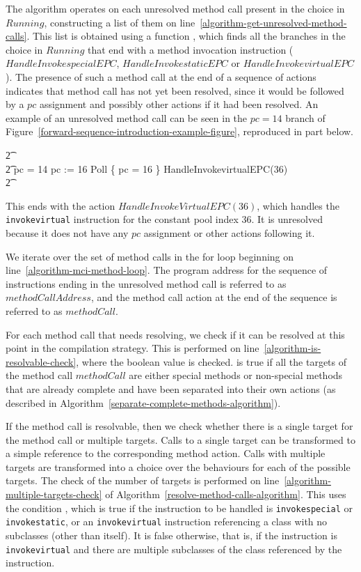 The algorithm operates on each unresolved method call present in the
choice in $Running$, constructing a list of them on
line~\ref{algorithm-get-unresolved-method-calls}.
This list is obtained using a function ,
which finds all the branches in the choice in $Running$ that end with
a method invocation instruction ($HandleInvokespecialEPC$,
$HandleInvokestaticEPC$ or $HandleInvokevirtualEPC$).
The presence of such a method call at the end of a sequence of actions
indicates that method call has not yet been resolved, since it would
be followed by a $pc$ assignment and possibly other actions if it had
been resolved.
An example of an unresolved method call can be seen in the $pc = 14$
branch of Figure~\ref{forward-sequence-introduction-example-figure},
reproduced in part below.
\begin{circusaction}
  \t2 {} \cdots {} \\
  \t2 {} \circelse pc = 14 \circthen \cdots \circseq pc := 16 \circseq Poll \circseq \{ pc = 16 \} \circseq HandleInvokevirtualEPC(36) \\
  \t2 {} \cdots {}
\end{circusaction}
This ends with the action $HandleInvokeVirtualEPC(36)$, which handles
the \texttt{invokevirtual} instruction for the constant pool index
$36$.
It is unresolved because it does not have any $pc$ assignment or other
actions following it.

We iterate over the set of method calls in the for loop beginning on
line~\ref{algorithm-mci-method-loop}.
The program address for the sequence of instructions ending in the
unresolved method call is referred to as $methodCallAddress$, and the
method call action at the end of the sequence is referred to as
$methodCall$.


For each method call that needs resolving, we check if it can be
resolved at this point in the compilation strategy.
This is performed on line~\ref{algorithm-is-resolvable-check}, where
the boolean value  is checked.
 is true if all the targets of the method
call $methodCall$ are either special methods or non-special methods that are
already complete and have been separated into their own actions (as
described in Algorithm~\ref{separate-complete-methods-algorithm}).

If the method call is resolvable, then we check whether there is a
single target for the method call or multiple targets.
Calls to a single target can be transformed to a simple reference to
the corresponding method action.
Calls with multiple targets are transformed into a choice over the
behaviours for each of the possible targets.
The check of the number of targets is performed on
line~\ref{algorithm-multiple-targets-check} of
Algorithm~\ref{resolve-method-calls-algorithm}.
This uses the condition , which is
true if the instruction to be handled is \texttt{invokespecial} or
\texttt{invokestatic}, or an \texttt{invokevirtual} instruction
referencing a class with no subclasses (other than itself).
It is false otherwise, that is, if the instruction is
\texttt{invokevirtual} and there are multiple subclasses of the class
referenced by the instruction.

